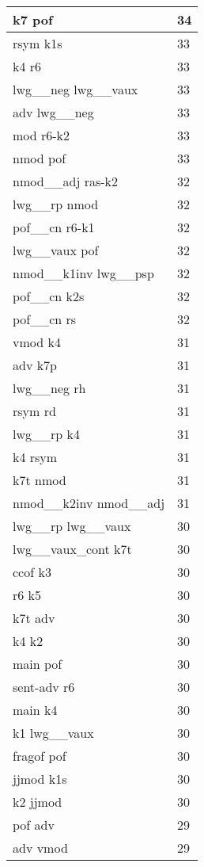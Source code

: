 \documentclass[a4 paper]{article}
\begin{document}
\begin{longtable}{p{}p{}}
k7 pof  & 34 \\ \midrule
rsym k1s  & 33 \\ \midrule
k4 r6  & 33 \\ \midrule
lwg\_\_neg lwg\_\_vaux  & 33 \\ \midrule
adv lwg\_\_neg  & 33 \\ \midrule
mod r6-k2  & 33 \\ \midrule
nmod pof  & 33 \\ \midrule
nmod\_\_adj ras-k2  & 32 \\ \midrule
lwg\_\_rp nmod  & 32 \\ \midrule
pof\_\_cn r6-k1  & 32 \\ \midrule
lwg\_\_vaux pof  & 32 \\ \midrule
nmod\_\_k1inv lwg\_\_psp  & 32 \\ \midrule
pof\_\_cn k2s  & 32 \\ \midrule
pof\_\_cn rs  & 32 \\ \midrule
vmod k4  & 31 \\ \midrule
adv k7p  & 31 \\ \midrule
lwg\_\_neg rh  & 31 \\ \midrule
rsym rd  & 31 \\ \midrule
lwg\_\_rp k4  & 31 \\ \midrule
k4 rsym  & 31 \\ \midrule
k7t nmod  & 31 \\ \midrule
nmod\_\_k2inv nmod\_\_adj  & 31 \\ \midrule
lwg\_\_rp lwg\_\_vaux  & 30 \\ \midrule
lwg\_\_vaux\_cont k7t  & 30 \\ \midrule
ccof k3  & 30 \\ \midrule
r6 k5  & 30 \\ \midrule
k7t adv  & 30 \\ \midrule
k4 k2  & 30 \\ \midrule
main pof  & 30 \\ \midrule
sent-adv r6  & 30 \\ \midrule
main k4  & 30 \\ \midrule
k1 lwg\_\_vaux  & 30 \\ \midrule
fragof pof  & 30 \\ \midrule
jjmod k1s  & 30 \\ \midrule
k2 jjmod  & 30 \\ \midrule
pof adv  & 29 \\ \midrule
adv vmod  & 29 \\ \midrule

\end{longtable}
\end{document}
